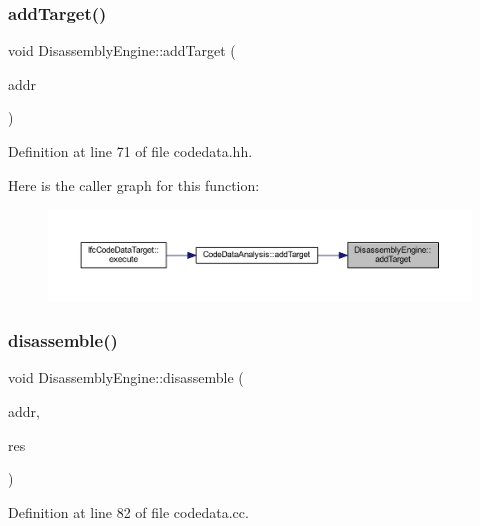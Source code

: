 \subsubsection{\texorpdfstring{addTarget()}{addTarget()}}
{\footnotesize\ttfamily void Disassembly\+Engine\+::add\+Target (\begin{DoxyParamCaption}\item[{const \mbox{\hyperlink{class_address}{Address}} \&}]{addr }\end{DoxyParamCaption})\hspace{0.3cm}{\ttfamily [inline]}}



Definition at line 71 of file codedata.\+hh.

Here is the caller graph for this function\+:
\nopagebreak
\begin{figure}[H]
\begin{center}
\leavevmode
\includegraphics[width=350pt]{class_disassembly_engine_ab2912ebd18c438f0d85425b8314ed0c9_icgraph}
\end{center}
\end{figure}
\mbox{\label{class_disassembly_engine_ad09a3d8b19efae613f8e45e59ccdd3e6}} 
\subsubsection{\texorpdfstring{disassemble()}{disassemble()}}
{\footnotesize\ttfamily void Disassembly\+Engine\+::disassemble (\begin{DoxyParamCaption}\item[{const \mbox{\hyperlink{class_address}{Address}} \&}]{addr,  }\item[{\mbox{\hyperlink{struct_disassembly_result}{Disassembly\+Result}} \&}]{res }\end{DoxyParamCaption})}



Definition at line 82 of file codedata.\+cc.

